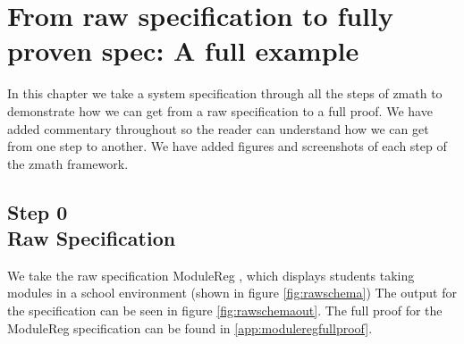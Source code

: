 \chapter{From raw specification to fully proven spec: A full example}
\label{ch:fullexample}

In this chapter we take a system specification through all the steps of
\gls{zmath} to demonstrate how we can get from a raw specification to a full
proof. We have added commentary throughout so the reader can understand how we
can get from one step to another. We have added figures and screenshots of each
step of the \gls{zmath} framework.

\section{Step 0\\Raw Specification}
We take the raw specification ModuleReg \cite{essenceofz}, which displays students
taking modules in a school environment (shown in figure \ref{fig:rawschema}) The
output for the specification can be seen in figure \ref{fig:rawschemaout}. The
full proof for the ModuleReg specification can be found in \ref{app:moduleregfullproof}.

